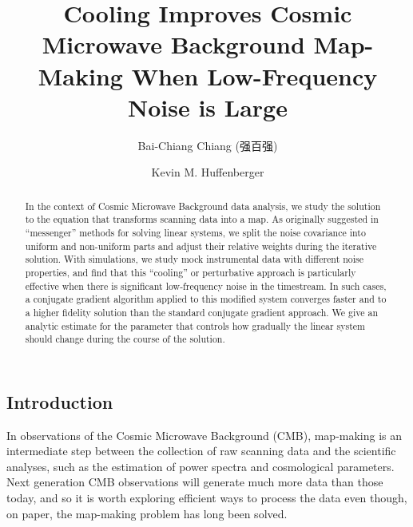 \documentclass[twocolumn,linenumbers]{aastex631}
\begin{document}
\begin{CJK*}{UTF8}{gbsn}

\title{Cooling Improves Cosmic Microwave Background Map-Making When Low-Frequency Noise is Large}


\author{Bai-Chiang Chiang (强百强)} 

\author[0000-0001-7109-0099]{Kevin M. Huffenberger}

 
\begin{abstract}

In the context of Cosmic Microwave Background data analysis, we study the solution to the equation that transforms scanning data into a map.
As originally suggested in ``messenger'' methods for solving linear systems, we split the  noise covariance into uniform and non-uniform parts and adjust their relative weights during the iterative solution.
With simulations, we study mock instrumental data with different noise properties, and find that this ``cooling'' or perturbative approach is particularly effective when there is significant low-frequency noise in the timestream.  In such cases, a conjugate gradient algorithm applied to this modified system converges faster and to a higher fidelity solution than the standard conjugate gradient approach. %
We give an analytic estimate for the parameter that controls how gradually the linear system should change during the course of the solution.

\end{abstract}


\section{Introduction} \label{sec:intro}


In observations of the Cosmic Microwave Background (CMB), map-making is an intermediate step between the collection of raw scanning data and the scientific analyses, such as the estimation of power spectra and cosmological parameters.
Next generation CMB observations will generate much more data than those today, and so
it is worth exploring efficient ways to process the data even though, on paper, the map-making problem has long been solved.


\end{CJK*}
\end{document}
